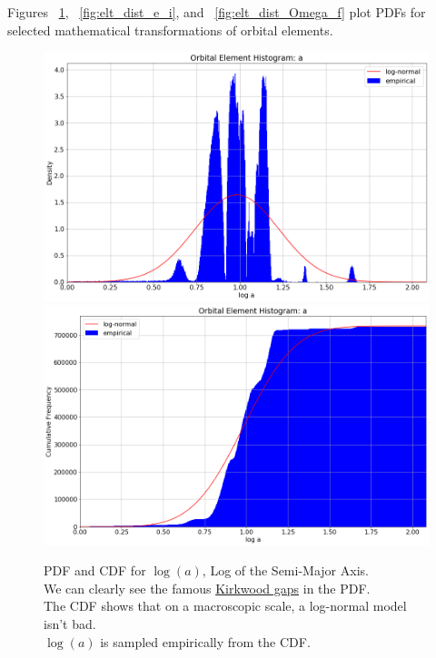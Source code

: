 Figures ~\ref{fig:elt_dist_a}, ~\ref{fig:elt_dist_e_i}, and ~\ref{fig:elt_dist_Omega_f} plot PDFs 
for selected mathematical transformations of orbital elements.
\begin{figure}[hbt!]
\begin{center}
\includegraphics[width=1.0\textwidth]{../figs/elts/elt_hist_a_pdf.png}
\includegraphics[width=1.0\textwidth]{../figs/elts/elt_hist_a_cdf.png}
\end{center}
\caption[PDF and CDF for $\log(a)$, Log of the Semi-Major Axis.]
{PDF and CDF for $\log(a)$, Log of the Semi-Major Axis.\\
We can clearly see the famous \href{https://en.wikipedia.org/wiki/Kirkwood_gap}{Kirkwood gaps} in the PDF. \\
The CDF shows that on a macroscopic scale, a log-normal model isn't bad.\\
$\log(a)$ is sampled empirically from the CDF.}
\label{fig:elt_dist_a}
\end{figure}
\clearpage

